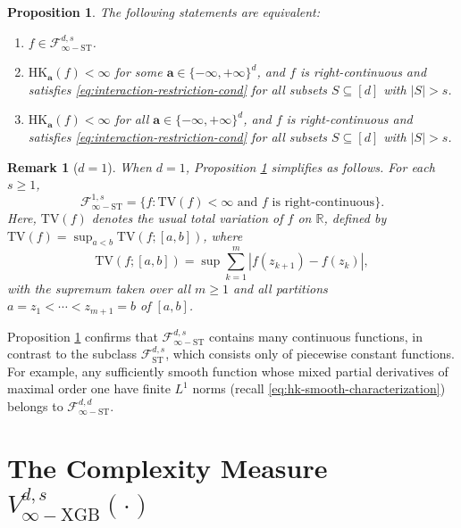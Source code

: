 \documentclass[10pt]{article}
\newtheorem{proposition}{Proposition}
\newtheorem{remark}{Remark}
\newcommand{\F}{{\mathcal{F}}}
\newcommand{\R}{{\mathbb R}}
\newcommand{\fst}{{\mathcal{F}^{d, s}_{\text{ST}}}}
\newcommand{\fstinf}{{\mathcal{F}^{d, s}_{\infty-\text{ST}}}}
\newcommand{\vinfxgb}{{V^{d, s}_{\infty-\text{XGB}}}}
\newcommand{\tv}{{\text{TV}}}
\newcommand{\hk}{{\text{HK}}}
\newcommand{\abf}{{\mathbf{a}}}
\begin{document}
\begin{proposition}\label{prop:fstinf-charac}
    The following statements are equivalent:
    \begin{enumerate}[label = (\alph*)]
        \item $f \in \fstinf$.
        \item $\hk_{\abf}(f) < \infty$ for some 
        $\abf \in \{-\infty, +\infty\}^d$, and $f$ is right-continuous 
        and satisfies \eqref{eq:interaction-restriction-cond} for 
        all subsets $S \subseteq [d]$ with $|S| > s$.
        \item $\hk_{\abf}(f) < \infty$ for all 
        $\abf \in \{-\infty, +\infty\}^d$, and $f$ is right-continuous 
        and satisfies \eqref{eq:interaction-restriction-cond} for 
        all subsets $S \subseteq [d]$ with $|S| > s$.
    \end{enumerate}
\end{proposition}

\begin{remark}[$d = 1$]
    When $d = 1$, Proposition \ref{prop:fstinf-charac}
    simplifies as follows. For each $s \ge 1$, 
    \begin{equation*}
        \F^{1, s}_{\infty-\text{ST}}  
        = \big\{f: \tv(f) < \infty \text{ and } 
        f \text{ is right-continuous}\big\}.
    \end{equation*}
    Here, $\tv(f)$ denotes the usual total variation of $f$ 
    on $\R$, defined by
    $\tv(f) = \sup_{a < b} \tv(f; [a, b])$, where
    \begin{equation*}
        \tv(f; [a, b]) = \sup
        \sum_{k = 1}^{m} |f(z_{k + 1}) - f(z_k)|,
    \end{equation*}
    with the supremum taken over all $m \ge 1$ and 
    all partitions $a = z_1 < \cdots < z_{m + 1} = b$ of $[a, b]$. 
\end{remark}

Proposition \ref{prop:fstinf-charac} confirms that $\fstinf$ 
contains many continuous functions, in contrast to the subclass 
$\fst$, which consists only of piecewise constant functions. For 
example, any sufficiently smooth function whose mixed partial 
derivatives of maximal order one have finite $L^1$ norms (recall 
\eqref{eq:hk-smooth-characterization}) belongs to 
$\F^{d, d}_{\infty-\text{ST}}$.



\section{The Complexity Measure $\vinfxgb(\cdot)$}
\label{sec:vinfxgb}
\end{document}
